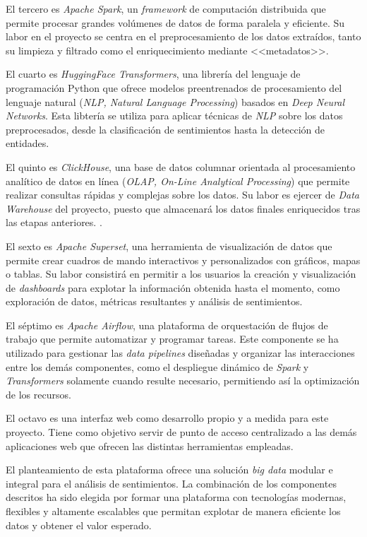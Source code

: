 El tercero es \textit{Apache Spark}, un \textit{framework} de computación distribuida que permite procesar grandes volúmenes de datos de forma paralela y eficiente. Su labor en el proyecto se centra en el preprocesamiento de los datos extraídos, tanto su limpieza y filtrado como el enriquecimiento mediante <<metadatos>>.

El cuarto es \textit{HuggingFace Transformers}, una librería del lenguaje de programación Python que ofrece modelos preentrenados de procesamiento del lenguaje natural (\textit{NLP, Natural Language Processing}) basados en \textit{Deep Neural Networks}. Esta libtería se utiliza para aplicar técnicas de \textit{NLP} sobre los datos preprocesados, desde la clasificación de sentimientos hasta la detección de entidades. 

El quinto es \textit{ClickHouse}, una base de datos columnar orientada al procesamiento analítico de datos en línea (\textit{OLAP, On-Line Analytical Processing}) que permite realizar consultas rápidas y complejas sobre los datos. Su labor es ejercer de \textit{Data Warehouse} del proyecto, puesto que almacenará los datos finales enriquecidos tras las etapas anteriores. .

El sexto es \textit{Apache Superset}, una herramienta de visualización de datos que permite crear cuadros de mando interactivos y personalizados con gráficos, mapas o tablas. Su labor consistirá en permitir a los usuarios la creación y visualización de \textit{dashboards} para explotar la información obtenida hasta el momento, como exploración de datos, métricas resultantes y análisis de sentimientos.

El séptimo es \textit{Apache Airflow}, una plataforma de orquestación de flujos de trabajo que permite automatizar y programar tareas. Este componente se ha utilizado para gestionar las \textit{data pipelines} diseñadas y organizar las interacciones entre los demás componentes, como el despliegue dinámico de \textit{Spark} y \textit{Transformers} solamente cuando resulte necesario, permitiendo así la optimización de los recursos.

El octavo es una interfaz web como desarrollo propio y a medida para este proyecto. Tiene como objetivo servir de punto de acceso centralizado a las demás aplicaciones web que ofrecen las distintas herramientas empleadas.

El planteamiento de esta plataforma ofrece una solución \textit{big data} modular e integral para el análisis de sentimientos. La combinación de los componentes descritos ha sido elegida por formar una plataforma con tecnologías modernas, flexibles y altamente escalables que permitan explotar de manera eficiente los datos y obtener el valor esperado.


